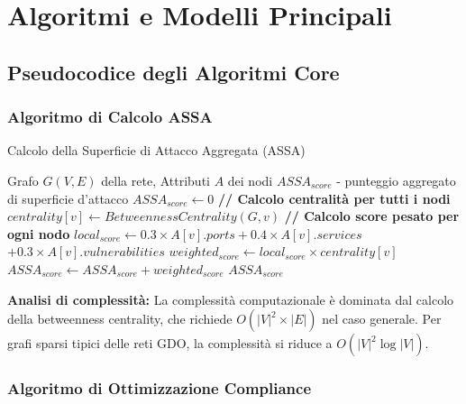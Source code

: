 
\chapter{\texorpdfstring{Algoritmi e Modelli Principali}{Appendice C - Algoritmi e Modelli Principali}}
\label{app:algoritmi}

\newtheorem{theorem}{Teorema}

\section{\texorpdfstring{Pseudocodice degli Algoritmi Core}{C.1 - Pseudocodice degli Algoritmi Core}}

\subsection{\texorpdfstring{Algoritmo di Calcolo ASSA}{C.1.1 - Algoritmo di Calcolo ASSA}}

\begin{algorithm}
\caption{Calcolo della Superficie di Attacco Aggregata (ASSA)}
\label{alg:assa}
\begin{algorithmic}
\Require Grafo $G(V,E)$ della rete, Attributi $A$ dei nodi
\Ensure $ASSA_{score}$ - punteggio aggregato di superficie d'attacco
\State $ASSA_{score} \gets 0$
\State \textbf{// Calcolo centralità per tutti i nodi}
    \State $centrality[v] \gets BetweennessCentrality(G, v)$
\EndFor
\State \textbf{// Calcolo score pesato per ogni nodo}
    \State $local_{score} \gets 0.3 \times A[v].ports + 0.4 \times A[v].services$
    \State \hspace{2.3cm} $+ 0.3 \times A[v].vulnerabilities$
    \State $weighted_{score} \gets local_{score} \times centrality[v]$
    \State $ASSA_{score} \gets ASSA_{score} + weighted_{score}$
\EndFor
\State \Return $ASSA_{score}$
\end{algorithmic}
\end{algorithm}

\textbf{Analisi di complessità:} La complessità computazionale è dominata dal calcolo della betweenness centrality, che richiede $O(|V|^2 \times |E|)$ nel caso generale. Per grafi sparsi tipici delle reti GDO, la complessità si riduce a $O(|V|^2 \log |V|)$.

\subsection{\texorpdfstring{Algoritmo di Ottimizzazione Compliance}{C.1.2 - Algoritmo di Ottimizzazione Compliance}}

